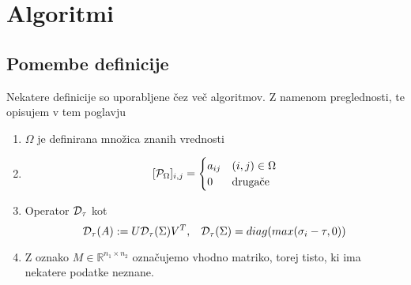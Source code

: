 \chapter{Algoritmi}


\section{Pomembe definicije}
Nekatere definicije so uporabljene čez več algoritmov. Z namenom preglednosti, te opisujem v tem poglavju
\begin{enumerate}
  \item $\Omega$ je definirana množica znanih vrednosti
  \item \[ [\mathcal{P}_\Omega]_{i,j} = \begin{cases}
            a_{ij} & (i, j) \in \Omega \\
            0      & \textrm{drugače}
          \end{cases}
        \]
  \item Operator $\mathcal{D}_\tau$ kot \[
            \mathcal{D}_\tau(A) := U \mathcal{D}_\tau(\Sigma) V^T, \hspace{0.3cm} \mathcal{D}_\tau(\Sigma) = diag(max(\sigma_i - \tau, 0))
        \] \cite{CCS}
  \item Z oznako $M \in \mathbb{R}^{n_1 \times n_2}$ označujemo vhodno matriko, torej tisto, ki ima nekatere podatke neznane.
\end{enumerate}






